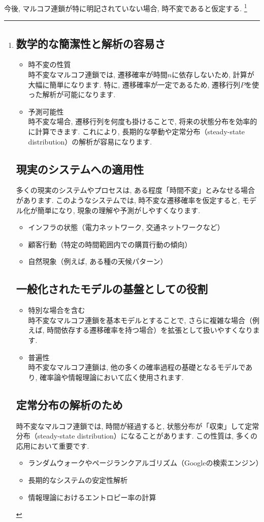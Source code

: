 \documentclass[a4j]{jsarticle}
\begin{document}
 今後, マルコフ連鎖が特に明記されていない場合, 時不変であると仮定する.
\footnote{
	\subsection*{数学的な簡潔性と解析の容易さ}
	\begin{itemize}
		\item 時不変の性質\\
		      時不変なマルコフ連鎖では, 遷移確率が時間$n$に依存しないため, 計算が大幅に簡単になります. 特に, 遷移確率が一定であるため, 遷移行列$P$を使った解析が可能になります.
		\item 予測可能性\\
		      時不変な場合, 遷移行列を何度も掛けることで, 将来の状態分布を効率的に計算できます. これにより, 長期的な挙動や定常分布（steady-state distribution）の解析が容易になります.
	\end{itemize}
	\subsection*{現実のシステムへの適用性}
	多くの現実のシステムやプロセスは, ある程度「時間不変」とみなせる場合があります. このようなシステムでは, 時不変な遷移確率を仮定すると, モデル化が簡単になり, 現象の理解や予測がしやすくなります.
	\begin{itemize}
		\item インフラの状態（電力ネットワーク, 交通ネットワークなど）
		\item 顧客行動（特定の時間範囲内での購買行動の傾向）
		\item 自然現象（例えば, ある種の天候パターン）
	\end{itemize}
	\subsection*{一般化されたモデルの基盤としての役割}
	\begin{itemize}
		\item 特別な場合を含む\\
		      時不変なマルコフ連鎖を基本モデルとすることで, さらに複雑な場合（例えば, 時間依存する遷移確率を持つ場合）を拡張として扱いやすくなります.
		\item 普遍性\\
		      時不変なマルコフ連鎖は, 他の多くの確率過程の基礎となるモデルであり, 確率論や情報理論において広く使用されます.
	\end{itemize}
	\subsection*{定常分布の解析のため}
	時不変なマルコフ連鎖では, 時間が経過すると, 状態分布が「収束」して定常分布（steady-state distribution）になることがあります. この性質は, 多くの応用において重要です.
	\begin{itemize}
		\item ランダムウォークやページランクアルゴリズム（Googleの検索エンジン）
		\item 長期的なシステムの安定性解析
		\item 情報理論におけるエントロピー率の計算
	\end{itemize}
}
\\
\end{document}
